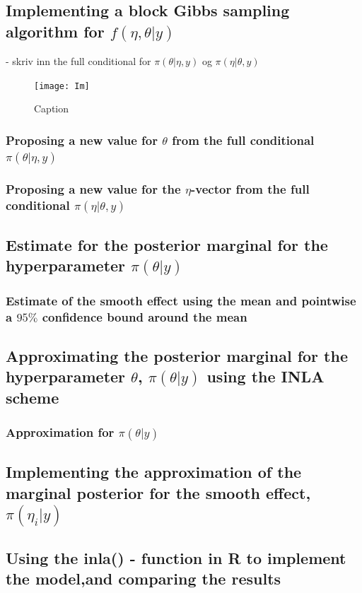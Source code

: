 \subsection{Implementing a block Gibbs sampling algorithm for $f(\eta, \theta |y)$}

- skriv inn the full conditional for $\pi(\theta|\eta, y)$ og $\pi(\eta|\theta, y)$


\begin{figure}
    \centering
    \texttt{[image: Im]}
    \caption{Caption}
    \label{fig:my_label}
\end{figure}
\subsubsection{Proposing a new value for $\theta$ from the full conditional $\pi(\theta | \eta,y)$}

\subsubsection{Proposing a new value for the $\eta$-vector from the full conditional $\pi(\eta | \theta, y)$}

\subsection{Estimate for the posterior marginal for the hyperparameter $\pi(\theta|y)$}

\subsubsection{Estimate of the smooth effect using the mean and pointwise a $95 \%$ confidence bound around the mean}

\subsection{Approximating the posterior marginal for the hyperparameter $\theta$, $\pi(\theta|y)$ using the INLA scheme}

\subsubsection{Approximation for $\pi(\theta|y)$}

\subsection{Implementing the approximation of the marginal posterior for the smooth effect, $\pi(\eta_i | y)$}

\subsection{Using the inla() - function in R to implement the model,and comparing the results}

